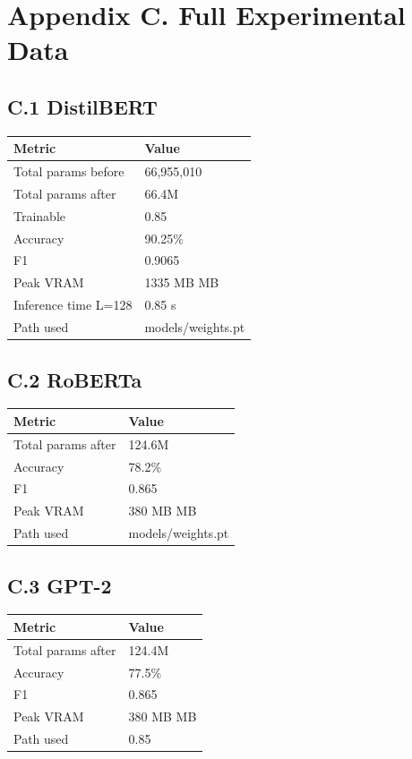 \section{Appendix C. Full Experimental Data}

\subsection{C.1 DistilBERT}

\begin{table}[H]
\centering
\small
\begin{tabular}{ll}
\toprule
\textbf{Metric} & \textbf{Value} \\
\midrule
Total params before & 66,955,010 \\
Total params after & 66.4M \\
Trainable & 0.85 \\
Accuracy & 90.25\% \\
F1 & 0.9065 \\
Peak VRAM & 1335 MB MB \\
Inference time L=128 & 0.85 s \\
Path used & models/weights.pt \\
\bottomrule
\end{tabular}
\end{table}

\subsection{C.2 RoBERTa}

\begin{table}[H]
\centering
\small
\begin{tabular}{ll}
\toprule
\textbf{Metric} & \textbf{Value} \\
\midrule
Total params after & 124.6M \\
Accuracy & 78.2\% \\
F1 & 0.865 \\
Peak VRAM & 380 MB MB \\
Path used & models/weights.pt \\
\bottomrule
\end{tabular}
\end{table}

\subsection{C.3 GPT-2}

\begin{table}[H]
\centering
\small
\begin{tabular}{ll}
\toprule
\textbf{Metric} & \textbf{Value} \\
\midrule
Total params after & 124.4M \\
Accuracy & 77.5\% \\
F1 & 0.865 \\
Peak VRAM & 380 MB MB \\
Path used & 0.85 \\
\bottomrule
\end{tabular}
\end{table}

